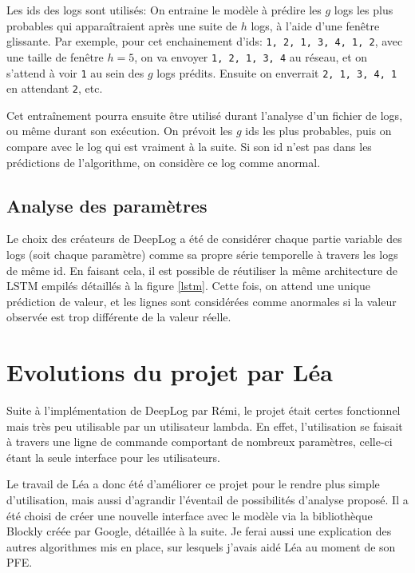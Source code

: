 \documentclass[openany, 11pt]{memoir}
\begin{document}
Les ids des \glspl{log} sont utilisés: On entraine le modèle à prédire les $g$ logs les plus probables qui apparaîtraient après une suite de $h$ logs, à l'aide d'une fenêtre glissante. Par exemple, pour cet enchainement d'ids: \texttt{1, 2, 1, 3, 4, 1, 2}, avec une taille de fenêtre $h=5$, on va envoyer \texttt{1, 2, 1, 3, 4} au réseau, et on s'attend à voir \texttt{1} au sein des $g$ logs prédits. Ensuite on enverrait \texttt{2, 1, 3, 4, 1} en attendant \texttt{2}, etc.

\bigskip
Cet entraînement pourra ensuite être utilisé durant l'analyse d'un fichier de \glspl{log}, ou même durant son exécution. On prévoit les $g$ ids les plus probables, puis on compare avec le log qui est vraiment à la suite. Si son id n'est pas dans les prédictions de l'algorithme, on considère ce log comme anormal.

\subsection{Analyse des paramètres}

Le choix des créateurs de DeepLog a été de considérer chaque partie variable des \glspl{log} (soit chaque paramètre) comme sa propre série temporelle à travers les logs de même id. En faisant cela, il est possible de réutiliser la même architecture de \gls{LSTM} empilés détaillés à la figure \ref{lstm}. Cette fois, on attend une unique prédiction de valeur, et les lignes sont considérées comme anormales si la valeur observée est trop différente de la valeur réelle.

\newpage
\section{Evolutions du projet par Léa}

Suite à l'implémentation de DeepLog par Rémi, le projet était certes fonctionnel mais très peu utilisable par un utilisateur lambda. En effet, l'utilisation se faisait à travers une ligne de commande comportant de nombreux paramètres, celle-ci étant la seule interface pour les utilisateurs.

Le travail de Léa a donc été d'améliorer ce projet pour le rendre plus simple d'utilisation, mais aussi d'agrandir l'éventail de possibilités d'analyse proposé. Il a été choisi de créer une nouvelle interface avec le modèle via la bibliothèque Blockly créée par Google, détaillée à la suite. Je ferai aussi une explication des autres algorithmes mis en place, sur lesquels j'avais aidé Léa au moment de son PFE.
\end{document}
